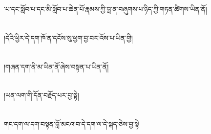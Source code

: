 ་པ་དང་སློབ་པ་དང་མི་སློབ་པ་ཆེན་པོ་རྣམས་ཀྱི་བླ་ན་བཞུགས་པ་ཉིད་ཀྱི་གཏན་ཚིགས་ཡིན་ནོ།\chapter{ }།དེའི་ཕྱིར་དེ་དག་ཁོ་ན་དངོས་སུ་ཕྱག་བྱ་བར་འོས་པ་ཡིན་གྱི།\chapter{ }།གཞན་དག་ནི་མ་ཡིན་ནོ་ཞེས་བསྟན་པ་ཡིན་ནོ།\chapter{ }།ཡན་ལག་གི་དོན་བརྗོད་པར་བྱ་སྟེ།\chapter{ }གང་དག་ལ་དག་བསྟན་བློ་མངའ་བ་དེ་དག་ལ་དེ་སྐད་ཅེས་བྱ་སྟེ